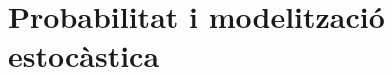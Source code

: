 \documentclass[../tercer.tex]{subfiles}
\begin{document}
\part{Probabilitat i modelització estocàstica}





\end{document}
